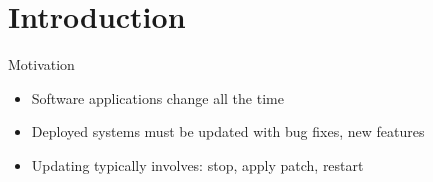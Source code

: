 


\section{Introduction}
\begin{frame}{Motivation}%
\begin{itemize}
\item Software applications change all the time
\item Deployed systems must be updated with bug fixes, new features
\item Updating typically involves: stop, apply patch, restart
\end{itemize}
\end{frame}

